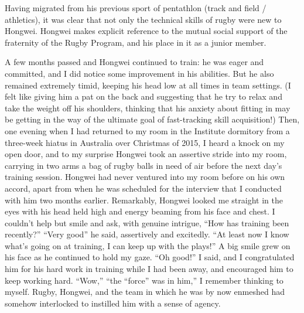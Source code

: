Having migrated from his previous sport of pentathlon (track and field / athletics), it was clear that not only the technical skills of rugby were new to Hongwei.  Hongwei makes explicit reference to the mutual social support of the fraternity of the Rugby Program, and his place in it as a junior member.


A few months passed and Hongwei continued to train: he was eager and committed, and I did notice some improvement in his abilities. But he also remained extremely timid, keeping his head low at all times in team settings.  (I felt like giving him a pat on the back and suggesting that he try to relax and take the weight off his shoulders, thinking that his anxiety about fitting in may be getting in the way of the ultimate goal of fast-tracking skill acquisition!)  Then, one evening when I had returned to my room in the Institute dormitory from a three-week hiatus in Australia over Christmas of 2015, I heard a knock on my open door, and to my surprise Hongwei took an assertive stride into my room, carrying in two arms a bag of rugby balls in need of air before the next day's training session.  Hongwei had never ventured into my room before on his own accord, apart from when he was scheduled for the interview that I conducted with him two months earlier.  Remarkably, Hongwei looked me straight in the eyes with his head held high and energy beaming from his face and chest.  I couldn’t help but smile and ask, with genuine intrigue, ``How has training been recently?''
``Very good'' he said, assertively and excitedly.  ``At least now I know what’s going on at training, I can keep up with the plays!''  A big smile grew on his face as he continued to hold my gaze.  ``Oh good!'' I said, and I congratulated him for his hard work in training while I had been away, and encouraged him to keep working hard. ``Wow,'' ``the ``force'' was in him,'' I remember thinking to myself.  Rugby, Hongwei, and the team in which he was by now enmeshed had somehow interlocked to instilled him with a sense of agency.

